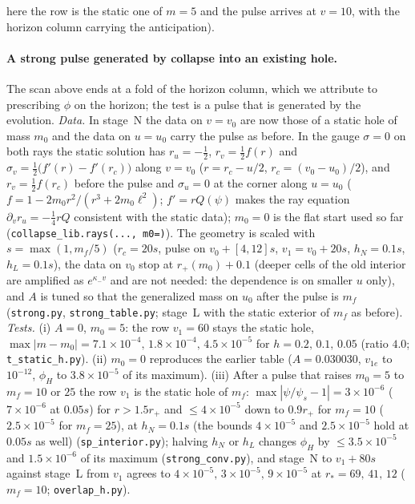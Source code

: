 \documentclass[11pt]{article}
\begin{document}
here the row is the static one of $m=5$ and the pulse arrives at $v=10$, with the horizon column carrying the anticipation).

\paragraph{A strong pulse generated by collapse into an existing hole.} The scan above ends at a fold of the horizon column, which we attribute to prescribing $\phi$ on the horizon; the test is a pulse that is generated by the evolution. \emph{Data.} In stage~N the data on $v=v_0$ are now those of a static hole of mass $m_0$ and the data on $u=u_0$ carry the pulse as before. In the gauge $\sigma=0$ on both rays the static solution has $r_u=-\tfrac12$, $r_v=\tfrac12f(r)$ and $\sigma_v=\tfrac12\bigl(f'(r)-f'(r_c)\bigr)$ along $v=v_0$ ($r=r_c-u/2$, $r_c=(v_0-u_0)/2$), and $r_v=\tfrac12f(r_c)$ before the pulse and $\sigma_u=0$ at the corner along $u=u_0$ ($f=1-2m_0r^{2}/(r^{3}+2m_0\ell^{2})$; $f'=rQ(\psi)$ makes the ray equation $\partial_vr_u=-\tfrac14rQ$ consistent with the static data); $m_0=0$ is the flat start used so far (\texttt{collapse\_lib.rays(..., m0=)}). The geometry is scaled with $s=\max(1,m_f/5)$ ($r_c=20s$, pulse on $v_0+[4,12]s$, $v_1=v_0+20s$, $h_N=0.1s$, $h_L=0.1s$), the data on $v_0$ stop at $r_+(m_0)+0.1$ (deeper cells of the old interior are amplified as $e^{\kappa_-v}$ and are not needed: the dependence is on smaller $u$ only), and $A$ is tuned so that the generalized mass on $u_0$ after the pulse is $m_f$ (\texttt{strong.py}, \texttt{strong\_table.py}; stage~L with the static exterior of $m_f$ as before). \emph{Tests.} (i) $A=0$, $m_0=5$: the row $v_1=60$ stays the static hole, $\max|m-m_0|=7.1\times10^{-4},\,1.8\times10^{-4},\,4.5\times10^{-5}$ for $h=0.2,\,0.1,\,0.05$ (ratio $4.0$; \texttt{t\_static\_h.py}). (ii) $m_0=0$ reproduces the earlier table ($A=0.030030$, $v_{1e}$ to $10^{-12}$, $\phi_H$ to $3.8\times10^{-5}$ of its maximum). (iii) After a pulse that raises $m_0=5$ to $m_f=10$ or $25$ the row $v_1$ is the static hole of $m_f$: $\max|\psi/\psi_s-1|=3\times10^{-6}$ ($7\times10^{-6}$ at $0.05s$) for $r>1.5r_+$ and $\le4\times10^{-5}$ down to $0.9r_+$ for $m_f=10$ ($2.5\times10^{-5}$ for $m_f=25$), at $h_N=0.1s$ (the bounds $4\times10^{-5}$ and $2.5\times10^{-5}$ hold at $0.05s$ as well) (\texttt{sp\_interior.py}); halving $h_N$ or $h_L$ changes $\phi_H$ by $\le3.5\times10^{-5}$ and $1.5\times10^{-6}$ of its maximum (\texttt{strong\_conv.py}), and stage~N to $v_1+80s$ against stage~L from $v_1$ agrees to $4\times10^{-5},\,3\times10^{-5},\,9\times10^{-5}$ at $r_*=69,\,41,\,12$ ($m_f=10$; \texttt{overlap\_h.py}).
\end{document}

